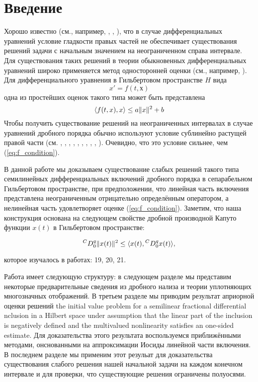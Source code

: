 \section{Введение}

Хорошо известно (см., например, \cite{coddington}, \cite{hartman}, \cite{krasnoselskii}), что в случае
дифференциальных уравнений условие гладкости правых частей не обеспечивает существования решений задачи с
начальным значением на неограниченном справа интервале. Для существования таких решений в теории обыкновенных
дифференциальных уравнений широко применяется метод односторонней оценки (см., например, \cite{coddington}).
Для дифференциального уравнения в Гильбертовом пространстве $H$ вида
\begin{equation*}
    x' = f(t,х)
\end{equation*}
\noindent одна из простейших оценок такого типа может быть представлена
\begin{equation}
    \label{eq:f_condition}
    \langle f(t,x),x\rangle \leq a \lVert x\rVert^{2} + b
\end{equation}
\noindent Чтобы получить существование решений на неограниченных интервалах в случае уравнений дробного порядка
обычно используют условие сублинейно растущей правой части (см. \cite{afanasova_nca}, \cite{afanasova_rm}, \cite{appell},
\cite{benedetti}, \cite{mainardi}, \cite{kamenskii_fpt}, \cite{kamenskii_aa}, \cite{kamenskii_fpta17}, \cite{kamenskii_fpta19},
\cite{kamenskii_m}). Очевидно, что это условие сильнее, чем (\ref{eq:f_condition}).

В данной работе мы доказываем существование слабых решений такого типа семилинейных дифференциальных включений дробного
порядка в сепарабельном Гильбертовом пространстве, при предположении, что линейная часть включения представлена неограниченным
отрицательно определённым оператором, а нелинейная часть удовлетворяет оценке (\ref{eq:f_condition}). Заметим, что
наша конструкция основана на следующем свойстве дробной производной Капуто функции $x(t)$ в Гильбертовом пространстве:

\begin{equation*}
    {}^{C} D_{0}^{q} \lVert x(t)\rVert^{2} \leq \langle x(t), {}^{C} D_{0}^{q} x(t) \rangle,
\end{equation*}

\noindent которое изучалось в работах: 19, 20, 21.

Работа имеет следующую структуру: в следующем разделе мы представим некоторые предварительные сведения из
дробного нализа и теории уплотняющих многозначных отображений. В третьем разделе мы приводим результат априорной
оценки решений the initial value problem for a semilinear fractional differential nclusion in a Hilbert space under
assumption that the linear part of the inclusion is negatively defined and the multivalued nonlinearity satisfies an
one-sided estimate. Для доказательства этого результата воспользуемся приближёнными методами, онснованными на аппроксимации
Иосиды линейной части включения. В последнем разделе мы применим этот резульат для доказательства существования
слабого решения нашей начальной задачи на каждом конечном интервале и для проверки, что существующие решения ограничены
полуосями.

